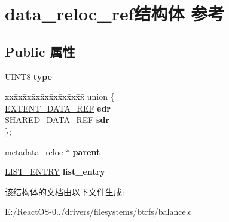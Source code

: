 \hypertarget{structdata__reloc__ref}{}\section{data\+\_\+reloc\+\_\+ref结构体 参考}
\label{structdata__reloc__ref}
\subsection*{Public 属性}
\begin{DoxyCompactItemize}
\item 
\mbox{\label{structdata__reloc__ref_a7290612102fca65acf89ba51826d3d29}} 
\hyperlink{_processor_bind_8h_ab27e9918b538ce9d8ca692479b375b6a}{U\+I\+N\+T8} {\bfseries type}
\item 
\mbox{\label{structdata__reloc__ref_ae4512aa45ba831209873eb3939efeb5d}} 
\begin{tabbing}
xx\=xx\=xx\=xx\=xx\=xx\=xx\=xx\=xx\=\kill
union \{\\
\>\hyperlink{struct_e_x_t_e_n_t___d_a_t_a___r_e_f}{EXTENT\_DATA\_REF} {\bfseries edr}\\
\>\hyperlink{struct_s_h_a_r_e_d___d_a_t_a___r_e_f}{SHARED\_DATA\_REF} {\bfseries sdr}\\
\}; \\

\end{tabbing}\item 
\mbox{\label{structdata__reloc__ref_a193413a6c4b2f8fec3dd80125c22729d}} 
\hyperlink{structmetadata__reloc}{metadata\+\_\+reloc} $\ast$ {\bfseries parent}
\item 
\mbox{\label{structdata__reloc__ref_ab1805b974f08a4de75857c91f90d78e0}} 
\hyperlink{struct___l_i_s_t___e_n_t_r_y}{L\+I\+S\+T\+\_\+\+E\+N\+T\+RY} {\bfseries list\+\_\+entry}
\end{DoxyCompactItemize}


该结构体的文档由以下文件生成\+:\begin{DoxyCompactItemize}
\item 
E\+:/\+React\+O\+S-\/0../drivers/filesystems/btrfs/balance.\+c\end{DoxyCompactItemize}
